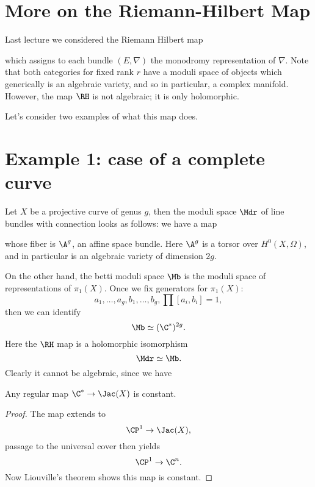 \documentclass[etingof-dmod.tex]{subfiles}
\begin{document}
\section{More on the Riemann-Hilbert Map}
  Last lecture we considered the Riemann Hilbert map


which assigns to each bundle $(E,\nabla)$ the monodromy representation of
$\nabla$. Note that both categories for fixed rank $r$ have a moduli space of
objects which generically is an algebraic variety, and so in particular, a
complex manifold. However, the map $\RH$ is not algebraic; it is only
holomorphic.

Let's consider two examples of what this map does.

\section{Example 1: case of a complete curve}
  Let $X$ be a projective curve of genus $g$, then the moduli space $\Mdr$ of line bundles
  with connection looks as follows: we have a map
  whose fiber is $\A^g$, an affine space bundle. Here $\A^g$ is a torsor over
  $H^0(X,\Omega)$, and in particular is an algebraic variety of dimension $2g$.

  On the other hand, the betti moduli space $\Mb$ is the moduli space of
  representations of $\pi_1(X)$. Once we fix generators for $\pi_1(X)$: $$a_1,
  \ldots, a_g, b_1, \ldots, b_g, \prod[a_i,b_i]=1,$$
  then we can identify $$\Mb \simeq (\C^*)^{2g}.$$
  Here the $\RH$ map is a holomorphic isomorphism $$\Mdr \simeq \Mb.$$ Clearly
  it cannot be algebraic, since we have

\begin{lem}
  Any regular map $\C^* \rightarrow \Jac(X)$ is constant.
\end{lem}
\begin{proof}
  The map extends to $$\CP^1 \rightarrow \Jac(X),$$ passage to the universal
  cover then yields $$\CP^1 \rightarrow \C^n.$$ Now Liouville's theorem shows
  this map is constant.
\end{proof}
\end{document}
